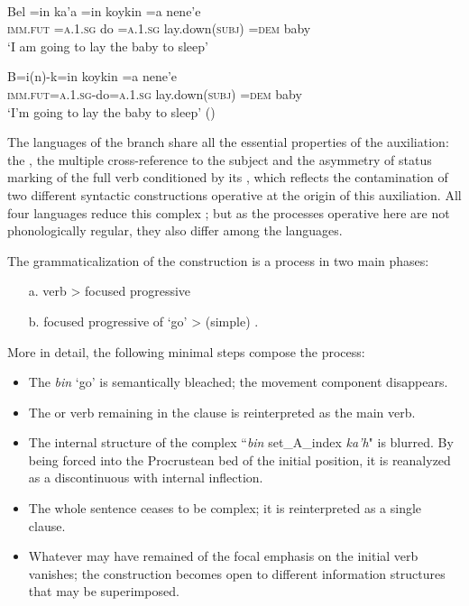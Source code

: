 \documentclass[output=paper]{langsci/langscibook}
\begin{document}
\ea\label{ex:lehmann:96}
\\

\ea
\gll  Bel      =in      ka’a  =in      koykin          =a    nene’e\\
  \textsc{imm.fut } \textsc{=a.1.sg}   do    =\textsc{a.1.sg}    lay.down(\textsc{subj})    =\textsc{dem}  baby\\
\glt ‘I am going to lay the baby to sleep’

\ex
\gll  B=i(n)-k=in              koykin          =a    nene’e\\
  \textsc{imm.fut=a.1.sg}{}-do=\textsc{a.1.sg}    lay.down(\textsc{subj})    =\textsc{dem}  baby\\
\glt ‘I’m going to lay the baby to sleep’ (\citealt[95]{BriceñoChel2000ir})
\z
\z

The languages of the  branch share all the essential properties of the  auxiliation: the , the multiple cross-reference to the subject and the asymmetry of status marking of the full verb conditioned by its , which reflects the contamination of two different syntactic constructions operative at the origin of this auxiliation. All four languages reduce this complex ; but as the processes operative here are not phonologically regular, they also differ among the languages.

The grammaticalization of the construction is a process in two main phases:

\begin{itemize}
\item[a.] 
verb  {\textgreater} focused progressive

\item[b.]
focused progressive of  ‘go’ {\textgreater} (simple) .
\end{itemize}

More in detail, the following minimal steps compose the process:

\begin{itemize}
\item  The  \textit{bin} ‘go’ is semantically bleached; the movement component disappears.
\item  The  or  verb remaining in the  clause is reinterpreted as the main verb.
\item The internal structure of the complex “\textit{bin} set\_A\_index \textit{ka’h}" is blurred. By being forced into the Procrustean bed of the initial position, it is reanalyzed as a discontinuous   with internal inflection.
\item The whole sentence ceases to be complex; it is reinterpreted as a single clause.
\item Whatever may have remained of the focal emphasis on the initial verb vanishes; the construction becomes open to different information structures that may be superimposed.
\end{itemize}
\end{document}
